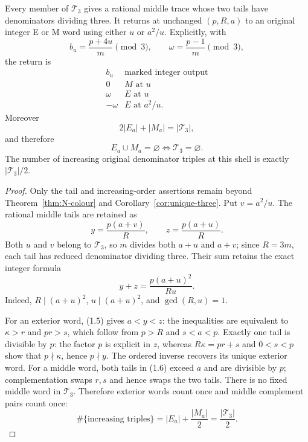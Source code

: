 \begin{theorem}\label{thm:third-defect}
Every member of $\mathcal T_3$ gives a rational middle trace whose two tails
have denominators dividing three.  It returns at unchanged $(p,R,a)$ to an
original integer E or M word using either $u$ or $a^2/u$.  Explicitly, with
\[
 b_u=\frac{p+4u}{m}\pmod3,\qquad
 \omega=\frac{p-1}{m}\pmod3,
\]
the return is
\[
 \begin{array}{c|c}
 b_u&\text{marked integer output}\\ \hline
 0&M\text{ at }u\\
 \omega&E\text{ at }u\\
 -\omega&E\text{ at }a^2/u.
 \end{array}                                                     \tag{5.3}
\]
Moreover
\[
 \boxed{2|E_a|+|M_a|=|\mathcal T_3|},                           \tag{5.4}
\]
and therefore
\[
 \boxed{E_a\cup M_a=\varnothing\Longleftrightarrow
 \mathcal T_3=\varnothing.}                                    \tag{5.5}
\]
The number of increasing original denominator triples at this shell is exactly
$|\mathcal T_3|/2$.
\end{theorem}

\begin{proof}
Only the tail and increasing-order assertions remain beyond
Theorem~\ref{thm:N-colour} and Corollary~\ref{cor:unique-three}.  Put
$v=a^2/u$.  The rational middle tails are retained as
\[
 y=\frac{p(a+v)}R,\qquad z=\frac{p(a+u)}R.                       \tag{5.6}
\]
Both $u$ and $v$ belong to $\mathcal T_3$, so $m$ divides both $a+u$ and
$a+v$; since $R=3m$, each tail has reduced denominator dividing three.  Their
sum retains the exact integer formula
\[
 y+z=\frac{p(a+u)^2}{Ru}.                                       \tag{5.7}
\]
Indeed, $R\mid(a+u)^2$, $u\mid(a+u)^2$, and $\gcd(R,u)=1$.

For an exterior word, (1.5) gives $a<y<z$: the inequalities are equivalent to
$\kappa>r$ and $pr>s$, which follow from $p>R$ and $s<a<p$.  Exactly one tail
is divisible by $p$: the factor $p$ is explicit in $z$, whereas
$R\kappa=pr+s$ and $0<s<p$ show that $p\nmid\kappa$, hence $p\nmid y$.
The ordered inverse recovers its unique exterior word.
For a middle word, both tails in (1.6) exceed $a$ and are divisible by $p$;
complementation swaps $r,s$ and hence swaps the two tails.  There is no fixed
middle word in $\mathcal T_3$.  Therefore exterior words count once and middle
complement pairs count once:
\[
 \#\{\text{increasing triples}\}=|E_a|+\frac{|M_a|}{2}
 =\frac{|\mathcal T_3|}{2}.
\]
\end{proof}

